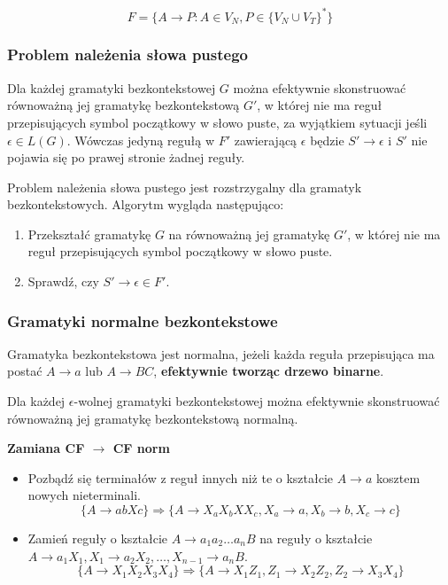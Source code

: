 \documentclass{../notatki}
\begin{document}
$$
F = \{A \rightarrow P : A \in V_N, P \in \{V_N \cup V_T\}^*\}
$$

\subsubsection{Problem należenia słowa pustego}

Dla każdej gramatyki bezkontekstowej $G$ można efektywnie skonstruować
równoważną jej gramatykę bezkontekstową $G'$, w której nie ma reguł
przepisujących symbol początkowy w słowo puste, za wyjątkiem sytuacji jeśli
$\epsilon \in L(G)$. Wówczas jedyną regułą w $F'$ zawierającą $\epsilon$ będzie
$S' \rightarrow \epsilon$ i $S'$ nie pojawia się po prawej stronie żadnej
reguły.

Problem należenia słowa pustego jest rozstrzygalny dla gramatyk
bezkontekstowych. Algorytm wygląda następująco:

\begin{enumerate}
  \item Przekształć gramatykę $G$ na równoważną jej gramatykę $G'$, w której
    nie ma reguł przepisujących symbol początkowy w słowo puste.
  \item Sprawdź, czy $S' \rightarrow \epsilon \in F'$.
\end{enumerate}

\subsubsection{Gramatyki normalne bezkontekstowe}

Gramatyka bezkontekstowa jest normalna, jeżeli każda reguła przepisująca ma
postać $A \rightarrow a$ lub $A \rightarrow BC$, \textbf{efektywnie tworząc
drzewo binarne}.

Dla każdej $\epsilon$-wolnej gramatyki bezkontekstowej można efektywnie
skonstruować równoważną jej gramatykę bezkontekstową normalną.

\noindent \textbf{Zamiana CF $\rightarrow$ CF norm}

\begin{itemize}
  \item Pozbądź się terminałów z reguł innych niż te o kształcie $A
    \rightarrow a$ kosztem nowych nieterminali.
    $$
    \{A \rightarrow abXc\} \Rightarrow \{A \rightarrow X_aX_bXX_c, X_a
    \rightarrow a, X_b \rightarrow b, X_c \rightarrow c\}
    $$
  \item Zamień reguły o kształcie $A \rightarrow a_1a_2\dots a_nB$ na reguły
    o kształcie $A \rightarrow a_1X_1, X_1 \rightarrow a_2X_2, \dots, X_{n-1}
    \rightarrow a_nB$.
    $$
    \{A \rightarrow X_1X_2X_3X_4\} \Rightarrow \{A \rightarrow X_1Z_1, Z_1
    \rightarrow X_2Z_2, Z_2 \rightarrow X_3X_4\}
    $$
\end{itemize}
\end{document}
